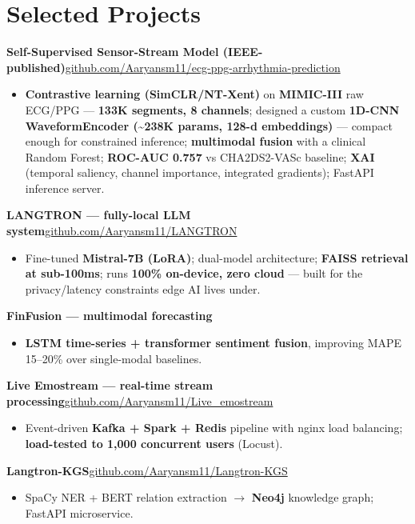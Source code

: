 \documentclass[10pt,a4paper]{article}
\begin{document}
\section*{Selected Projects}
\vspace{1pt}\textbf{Self-Supervised Sensor-Stream Model (IEEE-published)}\hfill {\small\href{https://github.com/Aaryansm11/ecg-ppg-arrhythmia-prediction}{github.com/Aaryansm11/ecg-ppg-arrhythmia-prediction}}
\begin{itemize}
\item \textbf{Contrastive learning (SimCLR/NT-Xent)} on \textbf{MIMIC-III} raw ECG/PPG --- \textbf{133K segments, 8 channels}; designed a custom \textbf{1D-CNN WaveformEncoder (\textasciitilde{}238K params, 128-d embeddings)} --- compact enough for constrained inference; \textbf{multimodal fusion} with a clinical Random Forest; \textbf{ROC-AUC 0.757} vs CHA2DS2-VASc baseline; \textbf{XAI} (temporal saliency, channel importance, integrated gradients); FastAPI inference server.
\end{itemize}
\vspace{1pt}\textbf{LANGTRON --- fully-local LLM system}\hfill {\small\href{https://github.com/Aaryansm11/LANGTRON}{github.com/Aaryansm11/LANGTRON}}
\begin{itemize}
\item Fine-tuned \textbf{Mistral-7B (LoRA)}; dual-model architecture; \textbf{FAISS retrieval at sub-100ms}; runs \textbf{100\% on-device, zero cloud} --- built for the privacy/latency constraints edge AI lives under.
\end{itemize}
\vspace{1pt}\textbf{FinFusion --- multimodal forecasting}
\begin{itemize}
\item \textbf{LSTM time-series + transformer sentiment fusion}, improving MAPE 15--20\% over single-modal baselines.
\end{itemize}
\vspace{1pt}\textbf{Live Emostream --- real-time stream processing}\hfill {\small\href{https://github.com/Aaryansm11/Live_emostream}{github.com/Aaryansm11/Live\_emostream}}
\begin{itemize}
\item Event-driven \textbf{Kafka + Spark + Redis} pipeline with nginx load balancing; \textbf{load-tested to 1,000 concurrent users} (Locust).
\end{itemize}
\vspace{1pt}\textbf{Langtron-KGS}\hfill {\small\href{https://github.com/Aaryansm11/Langtron-KGS}{github.com/Aaryansm11/Langtron-KGS}}
\begin{itemize}
\item SpaCy NER + BERT relation extraction $\rightarrow$ \textbf{Neo4j} knowledge graph; FastAPI microservice.
\end{itemize}
\end{document}
